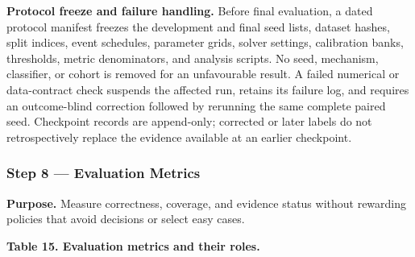\documentclass[
]{article}
\begin{document}
\textbf{Protocol freeze and failure handling.} Before final evaluation,
a dated protocol manifest freezes the development and final seed lists,
dataset hashes, split indices, event schedules, parameter grids, solver
settings, calibration banks, thresholds, metric denominators, and
analysis scripts. No seed, mechanism, classifier, or cohort is removed
for an unfavourable result. A failed numerical or data-contract check
suspends the affected run, retains its failure log, and requires an
outcome-blind correction followed by rerunning the same complete paired
seed. Checkpoint records are append-only; corrected or later labels do
not retrospectively replace the evidence available at an earlier
checkpoint.

\hypertarget{step-8-evaluation-metrics}{%
\subsubsection{Step 8 --- Evaluation
Metrics}\label{step-8-evaluation-metrics}}

\textbf{Purpose.} Measure correctness, coverage, and evidence status
without rewarding policies that avoid decisions or select easy cases.

\textbf{Table 15. Evaluation metrics and their roles.}
\end{document}
